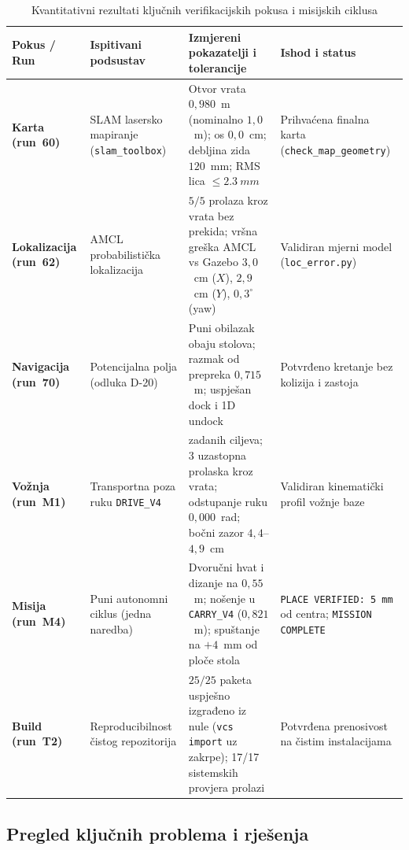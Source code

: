 \begin{table}[H]
  \centering
  \scriptsize
  \caption{Kvantitativni rezultati ključnih verifikacijskih pokusa i misijskih ciklusa}
  \label{tab:rezultati}
  \begin{tabularx}{\textwidth}{@{}>{\bfseries}p{1.8cm}>{\raggedright\arraybackslash}p{2.8cm}>{\raggedright\arraybackslash}X>{\raggedright\arraybackslash}p{3.2cm}@{}}
    \toprule
    Pokus / Run & Ispitivani podsustav & Izmjereni pokazatelji i tolerancije & Ishod i status \\
    \midrule
    Karta (run~60) & SLAM lasersko mapiranje (\texttt{slam\_toolbox}) & Otvor vrata $0{,}980$~m (nominalno $1{,}0$~m); os $0{,}0$~cm; debljina zida $120$~mm; RMS lica $\le \SI{2.3}{mm}$ & Prihvaćena finalna karta (\texttt{check\_map\_geometry}) \\
    Lokalizacija (run~62) & AMCL probabilistička lokalizacija & $5/5$ prolaza kroz vrata bez prekida; vršna greška AMCL vs Gazebo $3{,}0$~cm ($X$), $2{,}9$~cm ($Y$), $0{,}3^\circ$ (yaw) & Validiran mjerni model (\texttt{loc\_error.py}) \\
    Navigacija (run~70) & Potencijalna polja (odluka D-20) & Puni obilazak obaju stolova; razmak od prepreka $0{,}715$~m; uspješan dock i 1D undock & Potvrđeno kretanje bez kolizija i zastoja \\
    Vožnja (run~M1) & Transportna poza ruku \texttt{DRIVE\_V4} & 9 zadanih ciljeva; 3 uzastopna prolaska kroz vrata; odstupanje ruku $0{,}000$~rad; bočni zazor $4{,}4$--$4{,}9$~cm & Validiran kinematički profil vožnje baze \\
    Misija (run~M4) & Puni autonomni ciklus (jedna naredba) & Dvoručni hvat i dizanje na $0{,}55$~m; nošenje u \texttt{CARRY\_V4} ($0{,}821$~m); spuštanje na $+4$~mm od ploče stola & \texttt{PLACE VERIFIED: 5 mm} od centra; \texttt{MISSION COMPLETE} \\
    Build (run~T2) & Reproducibilnost čistog repozitorija & $25/25$ paketa uspješno izgrađeno iz nule (\texttt{vcs import} uz zakrpe); 17/17 sistemskih provjera prolazi & Potvrđena prenosivost na čistim instalacijama \\
    \bottomrule
  \end{tabularx}
\end{table}

\subsection{Pregled ključnih problema i rješenja}
\label{sec:09-problemi}

